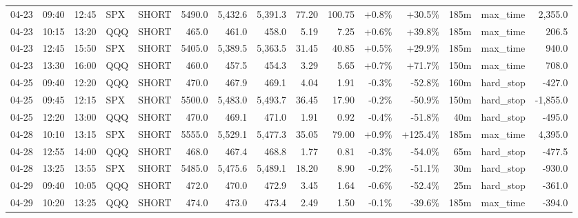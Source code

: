 \documentclass[11pt,a4paper,twoside]{article}
\begin{document}
\begin{landscape}
\begin{center}
\begin{longtable}{>{\color{txtmain}}l l l l l r r r r r r r r >{\color{txtmain}}l r}
04-23 & 09:40 & 12:45 & SPX & SHORT & 5490.0 & 5,432.6 & 5,391.3 & 77.20 & 100.75 & \textcolor{wingreen}{+0.8\%} & \textcolor{wingreen}{+30.5\%} & 185m & max\_time & \textcolor{wingreen}{2,355.0} \\
04-23 & 10:15 & 13:20 & QQQ & SHORT & 465.0 & 461.0 & 458.0 & 5.19 & 7.25 & \textcolor{wingreen}{+0.6\%} & \textcolor{wingreen}{+39.8\%} & 185m & max\_time & \textcolor{wingreen}{206.5} \\
04-23 & 12:45 & 15:50 & SPX & SHORT & 5405.0 & 5,389.5 & 5,363.5 & 31.45 & 40.85 & \textcolor{wingreen}{+0.5\%} & \textcolor{wingreen}{+29.9\%} & 185m & max\_time & \textcolor{wingreen}{940.0} \\
04-23 & 13:30 & 16:00 & QQQ & SHORT & 460.0 & 457.5 & 454.3 & 3.29 & 5.65 & \textcolor{wingreen}{+0.7\%} & \textcolor{wingreen}{+71.7\%} & 150m & max\_time & \textcolor{wingreen}{708.0} \\
04-25 & 09:40 & 12:20 & QQQ & SHORT & 470.0 & 467.9 & 469.1 & 4.04 & 1.91 & \textcolor{lossred}{-0.3\%} & \textcolor{lossred}{-52.8\%} & 160m & hard\_stop & \textcolor{lossred}{-427.0} \\
04-25 & 09:45 & 12:15 & SPX & SHORT & 5500.0 & 5,483.0 & 5,493.7 & 36.45 & 17.90 & \textcolor{lossred}{-0.2\%} & \textcolor{lossred}{-50.9\%} & 150m & hard\_stop & \textcolor{lossred}{-1,855.0} \\
04-25 & 12:20 & 13:00 & QQQ & SHORT & 470.0 & 469.1 & 471.0 & 1.91 & 0.92 & \textcolor{lossred}{-0.4\%} & \textcolor{lossred}{-51.8\%} & 40m & hard\_stop & \textcolor{lossred}{-495.0} \\
04-28 & 10:10 & 13:15 & SPX & SHORT & 5555.0 & 5,529.1 & 5,477.3 & 35.05 & 79.00 & \textcolor{wingreen}{+0.9\%} & \textcolor{wingreen}{+125.4\%} & 185m & max\_time & \textcolor{wingreen}{4,395.0} \\
04-28 & 12:55 & 14:00 & QQQ & SHORT & 468.0 & 467.4 & 468.8 & 1.77 & 0.81 & \textcolor{lossred}{-0.3\%} & \textcolor{lossred}{-54.0\%} & 65m & hard\_stop & \textcolor{lossred}{-477.5} \\
04-28 & 13:25 & 13:55 & SPX & SHORT & 5485.0 & 5,475.6 & 5,489.1 & 18.20 & 8.90 & \textcolor{lossred}{-0.2\%} & \textcolor{lossred}{-51.1\%} & 30m & hard\_stop & \textcolor{lossred}{-930.0} \\
04-29 & 09:40 & 10:05 & QQQ & SHORT & 472.0 & 470.0 & 472.9 & 3.45 & 1.64 & \textcolor{lossred}{-0.6\%} & \textcolor{lossred}{-52.4\%} & 25m & hard\_stop & \textcolor{lossred}{-361.0} \\
04-29 & 10:20 & 13:25 & QQQ & SHORT & 474.0 & 473.0 & 473.4 & 2.49 & 1.50 & \textcolor{lossred}{-0.1\%} & \textcolor{lossred}{-39.6\%} & 185m & max\_time & \textcolor{lossred}{-394.0} \\

\end{longtable}
\end{center}
\end{landscape}
\end{document}
